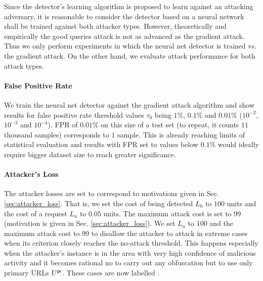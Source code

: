 Since the detector's learning algorithm is proposed to learn against an attacking adversary, it is reasonable to consider the detector based on a neural network shall be trained against both attacker types. However, theoretically and empirically the good queries attack is not as advanced as the gradient attack. Thus we only perform experiments in which the neural net detector is trained vs. the gradient attack. On the other hand, we evaluate attack performance for both attack types.

\paragraph{False Positive Rate}
We train the neural net detector against the gradient attack algorithm and show results for false positive rate threshold values $\tau_0$ being $1\%$, $0.1\%$ and $0.01\%$ ($10^{-2}$, $10^{-3}$ and $10^{-4}$). FPR of $0.01\%$ on this size of a test set (to repeat, it counts $11$ thousand samples) corresponds to $1$ sample. This is already reaching limits of statistical evaluation and results with FPR set to values below $0.1\%$ would ideally require bigger dataset size to reach greater significance.

\paragraph{Attacker's Loss}
The attacker losses are set to correspond to motivations given in Sec. \ref{sec:attacker_loss}. That is, we set the cost of being detected $L_0$ to $100$ units and the cost of a request $L_u$ to $0.05$ units. The maximum attack cost is set to $99$ (motivation is given in Sec. \ref{sec:attacker_loss}). We set $L_u$ to 100 and the maximum attack cost to 99 to disallow the attacker to attack in extreme cases when its criterion closely reaches the no-attack threshold. This happens especially when the attacker's instance is in the area with very high confidence of malicious activity and it becomes rational no to carry out any obfuscation but to use only primary URLs $U^{\mathsf{pr}}$. These cases are now labelled \NA.

